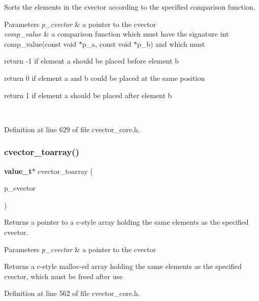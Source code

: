 Sorts the elements in the cvector according to the specified comparison function. 
\begin{DoxyParams}{Parameters}
{\em p\+\_\+cvector} & a pointer to the cvector \\
\hline
{\em comp\+\_\+value} & a comparison function which must have the signature int comp\+\_\+value(const void $\ast$p\+\_\+a, const void $\ast$p\+\_\+b) and which must
\begin{DoxyItemize}
\item return -\/1 if element a should be placed before element b
\item return 0 if element a and b could be placed at the same position
\item return 1 if element a should be placed after element b 
\end{DoxyItemize}\\
\hline
\end{DoxyParams}


Definition at line 629 of file cvector\+\_\+core.\+h.

\mbox{\label{cvector__interface_8h_acee2f57054d93a57da2b95f95df8fda8}} 
\subsubsection{cvector\+\_\+toarray()}
{\footnotesize\ttfamily \textbf{ value\+\_\+t}$\ast$ cvector\+\_\+toarray (\begin{DoxyParamCaption}\item[{\textbf{ cvector} $\ast$}]{p\+\_\+cvector }\end{DoxyParamCaption})}

Returns a pointer to a c-\/style array holding the same elements as the specified cvector. 
\begin{DoxyParams}{Parameters}
{\em p\+\_\+cvector} & a pointer to the cvector \\
\hline
\end{DoxyParams}
\begin{DoxyReturn}{Returns}
a c-\/style malloc-\/ed array holding the same elements as the specified cvector, which must be freed after use 
\end{DoxyReturn}


Definition at line 562 of file cvector\+\_\+core.\+h.


